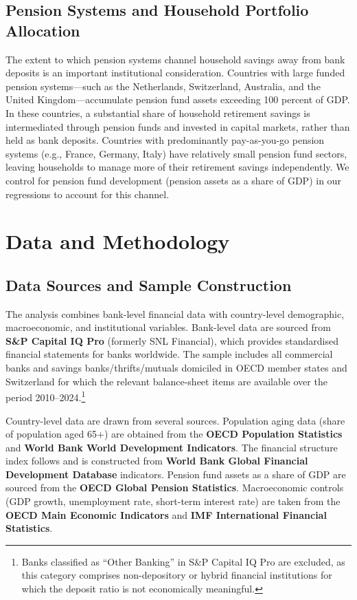 \documentclass[12pt,a4paper]{article}
\begin{document}
\subsection{Pension Systems and Household Portfolio Allocation}

The extent to which pension systems channel household savings away from bank deposits is an important institutional consideration. Countries with large funded pension systems---such as the Netherlands, Switzerland, Australia, and the United Kingdom---accumulate pension fund assets exceeding 100 percent of GDP. In these countries, a substantial share of household retirement savings is intermediated through pension funds and invested in capital markets, rather than held as bank deposits. Countries with predominantly pay-as-you-go pension systems (e.g., France, Germany, Italy) have relatively small pension fund sectors, leaving households to manage more of their retirement savings independently. We control for pension fund development (pension assets as a share of GDP) in our regressions to account for this channel.


\section{Data and Methodology}
\label{sec:data}

\subsection{Data Sources and Sample Construction}

The analysis combines bank-level financial data with country-level demographic, macroeconomic, and institutional variables. Bank-level data are sourced from \textbf{S\&P Capital IQ Pro} (formerly SNL Financial), which provides standardised financial statements for banks worldwide. The sample includes all commercial banks and savings banks/thrifts/mutuals domiciled in OECD member states and Switzerland for which the relevant balance-sheet items are available over the period 2010--2024.\footnote{Banks classified as ``Other Banking'' in S\&P Capital IQ Pro are excluded, as this category comprises non-depository or hybrid financial institutions for which the deposit ratio is not economically meaningful.}

Country-level data are drawn from several sources. Population aging data (share of population aged 65+) are obtained from the \textbf{OECD Population Statistics} and \textbf{World Bank World Development Indicators}. The financial structure index follows \citet{Levine2002} and is constructed from \textbf{World Bank Global Financial Development Database} indicators. Pension fund assets as a share of GDP are sourced from the \textbf{OECD Global Pension Statistics}. Macroeconomic controls (GDP growth, unemployment rate, short-term interest rate) are taken from the \textbf{OECD Main Economic Indicators} and \textbf{IMF International Financial Statistics}.
\end{document}
